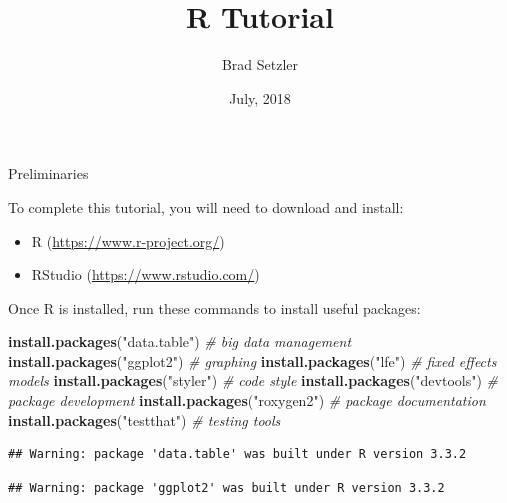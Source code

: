 \documentclass[10pt,ignorenonframetext,]{beamer}
\title{R Tutorial}
\author{Brad Setzler}
\institute{University of Chicago}
\date{July, 2018}
\newenvironment{Shaded}{\begin{snugshade}}{\end{snugshade}}
\newcommand{\KeywordTok}[1]{\textcolor[rgb]{0.13,0.29,0.53}{\textbf{{#1}}}}
\newcommand{\StringTok}[1]{\textcolor[rgb]{0.31,0.60,0.02}{{#1}}}
\newcommand{\CommentTok}[1]{\textcolor[rgb]{0.56,0.35,0.01}{\textit{{#1}}}}
\newcommand{\NormalTok}[1]{{#1}}
\providecommand{\tightlist}{%
\setlength{\itemsep}{0pt}\setlength{\parskip}{0pt}}
\begin{document}
\frame{\titlepage}

\begin{frame}
\tableofcontents[hideallsubsections]
\end{frame}

\begin{frame}

\end{frame}

\begin{frame}[fragile]{Preliminaries}

To complete this tutorial, you will need to download and install:

\begin{itemize}
\tightlist
\item
  R (\url{https://www.r-project.org/})
\item
  RStudio (\url{https://www.rstudio.com/})
\end{itemize}

Once R is installed, run these commands to install useful packages:

\small

\begin{Shaded}
\begin{Highlighting}[]
\KeywordTok{install.packages}\NormalTok{(}\StringTok{"data.table"}\NormalTok{) }\CommentTok{# big data management}
\KeywordTok{install.packages}\NormalTok{(}\StringTok{"ggplot2"}\NormalTok{) }\CommentTok{# graphing}
\KeywordTok{install.packages}\NormalTok{(}\StringTok{"lfe"}\NormalTok{) }\CommentTok{# fixed effects models}
\KeywordTok{install.packages}\NormalTok{(}\StringTok{"styler"}\NormalTok{) }\CommentTok{# code style}
\KeywordTok{install.packages}\NormalTok{(}\StringTok{"devtools"}\NormalTok{) }\CommentTok{# package development}
\KeywordTok{install.packages}\NormalTok{(}\StringTok{"roxygen2"}\NormalTok{) }\CommentTok{# package documentation}
\KeywordTok{install.packages}\NormalTok{(}\StringTok{"testthat"}\NormalTok{) }\CommentTok{# testing tools}
\end{Highlighting}
\end{Shaded}

\normalsize

\small

\begin{verbatim}
## Warning: package 'data.table' was built under R version 3.3.2
\end{verbatim}

\begin{verbatim}
## Warning: package 'ggplot2' was built under R version 3.3.2
\end{verbatim}

\normalsize

\end{frame}
\end{document}
